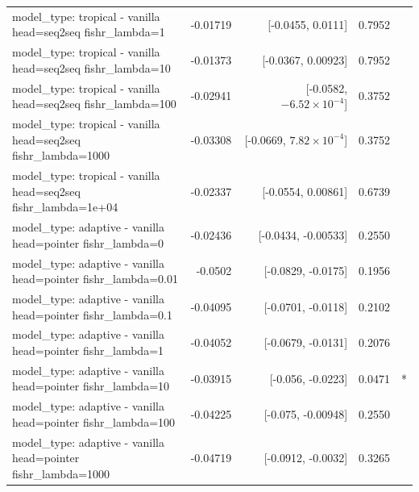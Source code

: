 \documentclass[10pt]{article}
\makeatletter
\newcommand{\stackcell}[1]{\begin{tabular}[t]{@{}l@{}}#1\end{tabular}}
\makeatother
\begin{document}
{\begin{longtable}{lrrrl}
\stackcell{model\_type: tropical - vanilla\\\footnotesize head=seq2seq fishr\_lambda=1 } & -0.01719 & [-0.0455, 0.0111] & 0.7952 & \\
\stackcell{model\_type: tropical - vanilla\\\footnotesize head=seq2seq fishr\_lambda=10 } & -0.01373 & [-0.0367, 0.00923] & 0.7952 & \\
\stackcell{model\_type: tropical - vanilla\\\footnotesize head=seq2seq fishr\_lambda=100 } & -0.02941 & [-0.0582, $-6.52\times10^{-4}$] & 0.3752 & \\
\stackcell{model\_type: tropical - vanilla\\\footnotesize head=seq2seq fishr\_lambda=1000 } & -0.03308 & [-0.0669, $7.82\times10^{-4}$] & 0.3752 & \\
\stackcell{model\_type: tropical - vanilla\\\footnotesize head=seq2seq fishr\_lambda=1e+04 } & -0.02337 & [-0.0554, 0.00861] & 0.6739 & \\
\stackcell{model\_type: adaptive - vanilla\\\footnotesize head=pointer fishr\_lambda=0 } & -0.02436 & [-0.0434, -0.00533] & 0.2550 & \\
\stackcell{model\_type: adaptive - vanilla\\\footnotesize head=pointer fishr\_lambda=0.01 } & -0.0502 & [-0.0829, -0.0175] & 0.1956 & \\
\stackcell{model\_type: adaptive - vanilla\\\footnotesize head=pointer fishr\_lambda=0.1 } & -0.04095 & [-0.0701, -0.0118] & 0.2102 & \\
\stackcell{model\_type: adaptive - vanilla\\\footnotesize head=pointer fishr\_lambda=1 } & -0.04052 & [-0.0679, -0.0131] & 0.2076 & \\
\stackcell{model\_type: adaptive - vanilla\\\footnotesize head=pointer fishr\_lambda=10 } & -0.03915 & [-0.056, -0.0223] & 0.0471 & *\\
\stackcell{model\_type: adaptive - vanilla\\\footnotesize head=pointer fishr\_lambda=100 } & -0.04225 & [-0.075, -0.00948] & 0.2550 & \\
\stackcell{model\_type: adaptive - vanilla\\\footnotesize head=pointer fishr\_lambda=1000 } & -0.04719 & [-0.0912, -0.0032] & 0.3265 & \\

\end{longtable}}
\end{document}
